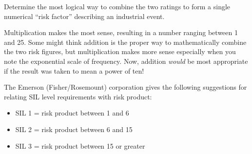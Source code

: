 Determine the most logical way to combine the two ratings to form a single numerical ``risk factor'' describing an industrial event.







Multiplication makes the most sense, resulting in a number ranging between 1 and 25.  Some might think addition is the proper way to mathematically combine the two risk figures, but multiplication makes more sense especially when you note the exponential scale of frequency.  Now, addition {\it would} be most appropriate if the result was taken to mean a power of ten!

\vskip 10pt

The Emerson (Fisher/Rosemount) corporation gives the following suggestions for relating SIL level requirements with risk product:

\begin{itemize}
\item{} SIL 1 = risk product between 1 and 6
\item{} SIL 2 = risk product between 6 and 15
\item{} SIL 3 = risk product between 15 or greater
\end{itemize}











